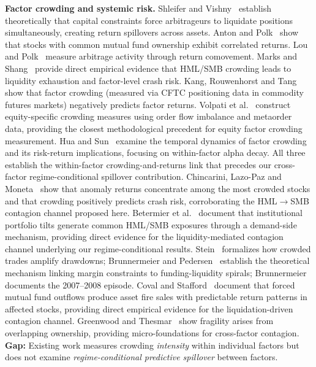 \documentclass[sigconf,anonymous]{acmart}
\begin{document}
\textbf{Factor crowding and systemic risk.}
Shleifer and Vishny~\cite{shleifer1997limits} establish theoretically that capital
constraints force arbitrageurs to liquidate positions simultaneously, creating
return spillovers across assets. Anton and Polk~\cite{anton2014connected} show that
stocks with common mutual fund ownership exhibit correlated returns. Lou and
Polk~\cite{lou2022comomentum} measure arbitrage activity through return comovement.
Marks and Shang~\cite{marks2019factor} provide direct empirical evidence that HML/SMB
crowding leads to liquidity exhaustion and factor-level crash risk.
Kang, Rouwenhorst and Tang~\cite{kang2021crowding} show that factor crowding
(measured via CFTC positioning data in commodity futures markets) negatively predicts factor returns.
Volpati et al.~\cite{volpati2020zooming} construct equity-specific crowding measures
using order flow imbalance and metaorder data, providing the closest methodological precedent for
equity factor crowding measurement.
Hua and Sun~\cite{hua2024dynamics} examine the temporal dynamics of factor crowding
and its risk-return implications, focusing on within-factor alpha decay.
All three establish the within-factor crowding-and-returns link that precedes our
cross-factor regime-conditional spillover contribution.
Chincarini, Lazo-Paz and Moneta~\cite{chincarini2026crowded} show that anomaly returns
concentrate among the most crowded stocks and that crowding positively predicts crash risk,
corroborating the HML$\to$SMB contagion channel proposed here.
Betermier et al.~\cite{betermier2025investor} document that institutional portfolio tilts
generate common HML/SMB exposures through a demand-side mechanism, providing direct evidence
for the liquidity-mediated contagion channel underlying our regime-conditional results.
Stein~\cite{stein2009presidential} formalizes how crowded trades amplify drawdowns;
Brunnermeier and Pedersen~\cite{brunnermeier2009market} establish the theoretical
mechanism linking margin constraints to funding-liquidity spirals;
Brunnermeier~\cite{brunnermeier2009deciphering} documents the 2007--2008 episode.
Coval and Stafford~\cite{coval2007asset} document that forced mutual fund outflows
produce asset fire sales with predictable return patterns in affected stocks,
providing direct empirical evidence for the liquidation-driven contagion channel.
Greenwood and Thesmar~\cite{greenwood2011stock} show fragility arises from overlapping
ownership, providing micro-foundations for cross-factor contagion.
\textbf{Gap:} Existing work measures crowding \emph{intensity} within individual
factors but does not examine \emph{regime-conditional predictive spillover} between factors.
\end{document}
